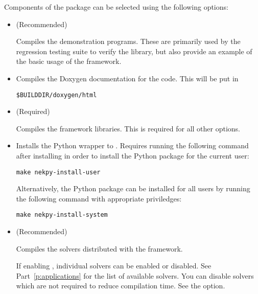 Components of the \nekpp package can be selected using the following options:
\begin{itemize}
    \item {} (Recommended)

    Compiles the demonstration programs. These are primarily used by the
    regression testing suite to verify the \nekpp library, but also provide an
    example of the basic usage of the framework.

    \item {}

    Compiles the Doxygen documentation for the code. This will be put in
    \begin{lstlisting}[style=BashInputStyle]
    $BUILDDIR/doxygen/html
    \end{lstlisting}

    \item {} (Required)

    Compiles the \nekpp framework libraries. This is required for all other
    options.

    \item {}

    Installs the Python wrapper to \nekpp. Requires running the following command
    after installing \nekpp in order to install the Python package for the
    current user:
    \begin{lstlisting}[style=BashInputStyle]
    make nekpy-install-user
    \end{lstlisting}

    Alternatively, the Python package can be installed for all users by running
    the following command with appropriate priviledges:
    \begin{lstlisting}[style=BashInputStyle]
    make nekpy-install-system
    \end{lstlisting}

    \item {} (Recommended)

    Compiles the solvers distributed with the \nekpp framework.

    If enabling , individual solvers can be
    enabled or disabled. See Part~\ref{p:applications} for the list of available
    solvers. You can disable solvers which are not required to reduce
    compilation time. See the  option.


\end{itemize}
